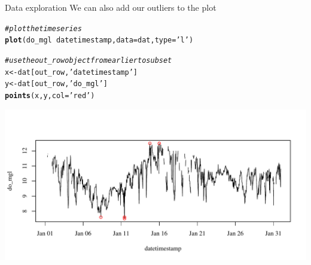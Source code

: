 \documentclass[xcolor=svgnames]{beamer}\usepackage[]{graphicx}\usepackage[]{color}
\makeatletter
\def\maxwidth{ %
  \ifdim\Gin@nat@width>\linewidth
    \linewidth
  \else
    \Gin@nat@width
  \fi
}
\newcommand{\hlstr}[1]{\textcolor[rgb]{0.192,0.494,0.8}{#1}}%
\newcommand{\hlcom}[1]{\textcolor[rgb]{0.678,0.584,0.686}{\textit{#1}}}%
\newcommand{\hlopt}[1]{\textcolor[rgb]{0,0,0}{#1}}%
\newcommand{\hlstd}[1]{\textcolor[rgb]{0.345,0.345,0.345}{#1}}%
\newcommand{\hlkwb}[1]{\textcolor[rgb]{0.69,0.353,0.396}{#1}}%
\newcommand{\hlkwc}[1]{\textcolor[rgb]{0.333,0.667,0.333}{#1}}%
\newcommand{\hlkwd}[1]{\textcolor[rgb]{0.737,0.353,0.396}{\textbf{#1}}}%
\newenvironment{kframe}{%
 \def\at@end@of@kframe{}%
 \ifinner\ifhmode%
  \def\at@end@of@kframe{\end{minipage}}%
  \begin{minipage}{\columnwidth}%
 \fi\fi%
 \def\FrameCommand##1{\hskip\@totalleftmargin \hskip-\fboxsep
 \colorbox{shadecolor}{##1}\hskip-\fboxsep
     \hskip-\linewidth \hskip-\@totalleftmargin \hskip\columnwidth}%
 \MakeFramed {\advance\hsize-\width
   \@totalleftmargin\z@ \linewidth\hsize
   \@setminipage}}%
 {\par\unskip\endMakeFramed%
 \at@end@of@kframe}
\newenvironment{knitrout}{}{} %
\makeatother
\begin{document}
\begin{frame}{Data exploration}
We can also add our outliers to the plot
\begin{knitrout}\scriptsize
{}\color{fgcolor}\begin{kframe}
\begin{alltt}
\hlcom{# plot the time series}
\hlkwd{plot}\hlstd{(do_mgl} \hlopt{~} \hlstd{datetimestamp,} \hlkwc{data} \hlstd{= dat,} \hlkwc{type} \hlstd{=} \hlstr{'l'}\hlstd{)}

\hlcom{# use the out_row object from earlier to subset}
\hlstd{x} \hlkwb{<-} \hlstd{dat[out_row,} \hlstr{'datetimestamp'}\hlstd{]}
\hlstd{y} \hlkwb{<-} \hlstd{dat[out_row,} \hlstr{'do_mgl'}\hlstd{]}
\hlkwd{points}\hlstd{(x, y,} \hlkwc{col} \hlstd{=} \hlstr{'red'}\hlstd{)}
\end{alltt}
\end{kframe}

{\centering \includegraphics[width=\maxwidth]{figure/doseries2} 

}



\end{knitrout}
\end{frame}
\end{document}
